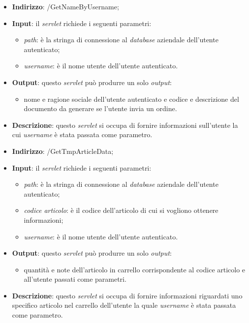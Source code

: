 
\begin{itemize}
	\item \textbf{Indirizzo}: /GetNameByUsername;
	\item \textbf{Input}: il \textit{servlet} richiede i seguenti parametri:
		\begin{itemize}
			\item \textit{path}: è la stringa di connessione al \textit{database} aziendale dell'utente autenticato;
			\item \textit{username}: è il nome utente dell'utente autenticato.
		\end{itemize}
	\item \textbf{Output}: questo \textit{servlet} può produrre un solo \textit{output}:
		\begin{itemize}
			\item nome e ragione sociale dell'utente autenticato e codice e descrizione del documento da generare se l'utente invia un ordine.
		\end{itemize}
	\item \textbf{Descrizione}: questo \textit{servlet} si occupa di fornire informazioni sull'utente la cui \textit{username} è stata passata come parametro.
\end{itemize}


\begin{itemize}
	\item \textbf{Indirizzo}: /GetTmpArticleData;
	\item \textbf{Input}: il \textit{servlet} richiede i seguenti parametri:
		\begin{itemize}
			\item \textit{path}: è la stringa di connessione al \textit{database} aziendale dell'utente autenticato;
			\item \textit{codice articolo}: è il codice dell'articolo di cui si vogliono ottenere informazioni;
			\item \textit{username}: è il nome utente dell'utente autenticato.
		\end{itemize}
	\item \textbf{Output}: questo \textit{servlet} può produrre un solo \textit{output}:
		\begin{itemize}
			\item quantità e note dell'articolo in carrello corrispondente al codice articolo e all'utente passati come parametri.
		\end{itemize}
	\item \textbf{Descrizione}: questo \textit{servlet} si occupa di fornire informazioni riguardati uno specifico articolo nel carrello dell'utente la quale \textit{username} è stata passata come parametro.
\end{itemize}

